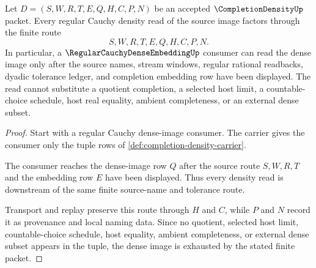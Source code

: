 \begin{theorem}
\label{thm:completion-density-regular-cauchy-dense-image}
Let $D=(S,W,R,T,E,Q,H,C,P,N)$ be an accepted $\CompletionDensityUp$ packet. Every regular Cauchy density read of the source image factors through the finite route
$$
S,W,R,T,E,Q,H,C,P,N .
$$
In particular, a $\RegularCauchyDenseEmbeddingUp$ consumer can read the dense image only after the source names, stream windows, regular rational readbacks, dyadic tolerance ledger, and completion embedding row have been displayed. The read cannot substitute a quotient completion, a selected host limit, a countable-choice schedule, host real equality, ambient completeness, or an external dense subset.
\end{theorem}
\begin{proof}
Start with a regular Cauchy dense-image consumer. The carrier gives the consumer only the tuple rows of \autoref{def:completion-density-carrier}.

The consumer reaches the dense-image row $Q$ after the source route $S,W,R,T$ and the embedding row $E$ have been displayed. Thus every density read is downstream of the same finite source-name and tolerance route.

Transport and replay preserve this route through $H$ and $C$, while $P$ and $N$ record it as provenance and local naming data. Since no quotient, selected host limit, countable-choice schedule, host equality, ambient completeness, or external dense subset appears in the tuple, the dense image is exhausted by the stated finite packet.
\end{proof}

